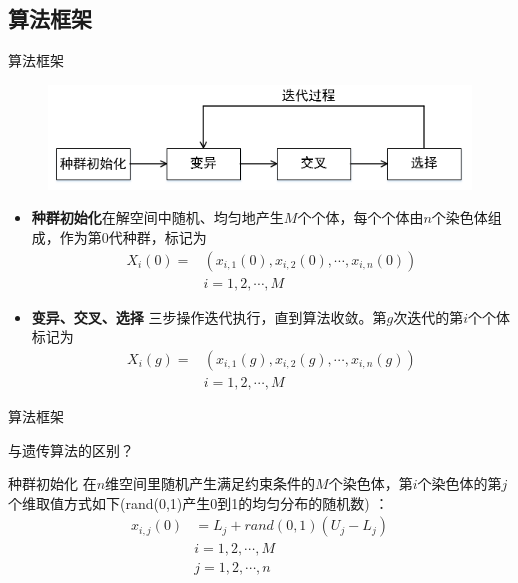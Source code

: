\subsection{算法框架}
\begin{frame}{算法框架}\small
	\begin{figure}
		\includegraphics [width =1.0\textwidth]{../images/framework.png}
	\end{figure}
	\begin{itemize}
		\item {\bf 种群初始化}在解空间中随机、均匀地产生$M$个个体，每个个体由$n$个染色体组成，作为第$0$代种群，标记为
		\begin{equation*}
			\begin{split}
				X_i(0)=&\left(x_{i,1}(0),x_{i,2}(0),\cdots,x_{i,n}(0)\right)\\
				& i=1,2,\cdots,M
			\end{split}
		\end{equation*}
		\item {\bf 变异、交叉、选择 }三步操作迭代执行，直到算法收敛。第$g$次迭代的第$i$个个体标记为
		\begin{equation*}
			\begin{split}
				X_i(g)=&\left(x_{i,1}(g),x_{i,2}(g),\cdots,x_{i,n}(g)\right)\\
				& i=1,2,\cdots,M
			\end{split}
		\end{equation*}
	\end{itemize}
\end{frame}

\begin{frame}{算法框架}
	\begin{center}
		\huge 与遗传算法的区别？
	\end{center}
\end{frame}

\begin{frame}{种群初始化}
	在$n$维空间里随机产生满足约束条件的$M$个染色体，第$i$个染色体的第$j$个维取值方式如下(rand(0,1)产生0到1的均匀分布的随机数) ：
	\begin{equation*}
		\begin{split}
			x_{i,j}(0) &= L_j + rand(0,1)\left(U_j-L_j\right)\\
			& i = 1,2,\cdots,M\\
			& j = 1,2,\cdots,n\\
		\end{split}
	\end{equation*}
\end{frame}

